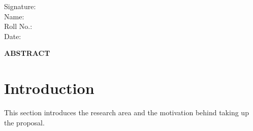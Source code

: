 \documentclass[12pt,a4paper]{article}
\begin{document}
\noindent Signature:\vspace{1cm}\\
Name: \\
Roll No.:\\
Date: \\
\clearpage
\begin{center}
{\large \bf ABSTRACT}
\end{center}

\clearpage
\tableofcontents
\newpage
\clearpage
\section{Introduction}
This section introduces the research area and the motivation behind taking up the proposal.
\end{document}
